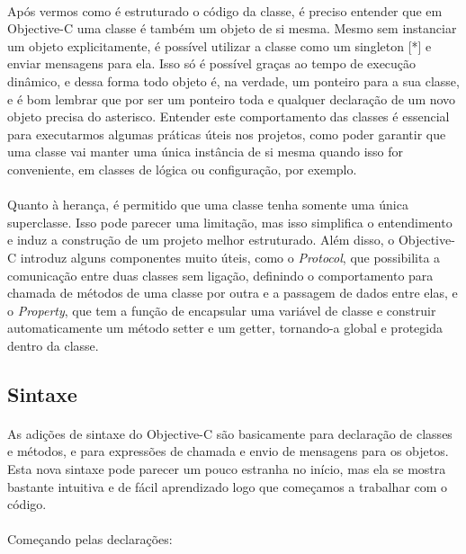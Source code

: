 \documentclass[a4paper,12pt,brazil,doubleside]{book}
\begin{document}
\paragraph{}Após vermos como é estruturado o código da classe, é preciso entender que em Objective-C uma classe é também um objeto de si mesma. Mesmo sem instanciar um objeto explicitamente, é possível utilizar a classe como um singleton [*] e enviar mensagens para ela. Isso só é possível graças ao tempo de execução dinâmico, e dessa forma todo objeto é, na verdade, um ponteiro para a sua classe, e é bom lembrar que por ser um ponteiro toda e qualquer declaração de um novo objeto precisa do asterisco. Entender este comportamento das classes é essencial para executarmos algumas práticas úteis nos projetos, como poder garantir que uma classe vai manter uma única instância de si mesma quando isso for conveniente, em classes de lógica ou configuração, por exemplo.
\paragraph{}Quanto à herança, é permitido que uma classe tenha somente uma única superclasse. Isso pode parecer uma limitação, mas isso simplifica o entendimento e induz a construção de um projeto melhor estruturado. Além disso, o Objective-C introduz alguns componentes muito úteis, como o \textit{Protocol}, que possibilita a comunicação entre duas classes sem ligação, definindo o comportamento para chamada de métodos de uma classe por outra e a passagem de dados entre elas, e o \textit{Property}, que tem a função de encapsular uma variável de classe e construir automaticamente um método setter e um getter, tornando-a global e protegida dentro da classe.

\bigskip 

\subsection{Sintaxe}

\paragraph{}As adições de sintaxe do Objective-C são basicamente para declaração de classes e métodos, e para expressões de chamada e envio de mensagens para os objetos. Esta nova sintaxe pode parecer um pouco estranha no início, mas ela se mostra bastante intuitiva e de fácil aprendizado logo que começamos a trabalhar com o código.
\paragraph{}Começando pelas declarações:
\end{document}
